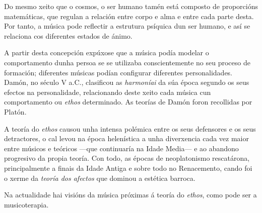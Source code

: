Do mesmo xeito que o cosmos, o ser humano tamén está composto de
proporcións matemáticas, que regulan a relación entre corpo e alma e
entre cada parte desta. Por tanto, a música pode reflectir a estrutura
psíquica dun ser humano, e así se relaciona cos diferentes estados de
ánimo.

A partir desta concepción expúxose que a música podía modelar o
comportamento dunha persoa se se utilizaba conscientemente no seu
proceso de formación; diferentes músicas podían configurar diferentes
personalidades. Damón, no século V a.C., clasificou as \emph{harmoníai}
da súa época segundo os seus efectos na personalidade, relacionando
deste xeito cada música cun comportamento ou \emph{ethos}
determinado. As teorías de Damón foron recollidas por Platón.

A teoría do \emph{ethos} causou unha intensa polémica entre os seus
defensores e os seus detractores, o cal levou na época helenística a
unha diverxencia cada vez maior entre músicos e teóricos ---que
continuaría na Idade Media--- e ao abandono progresivo da propia teoría.
Con todo, as épocas de neoplatonismo rescatárona, principalmente a
finais da Idade Antiga e sobre todo no Renacemento, cando foi o xerme da
\emph{teoría dos afectos} que dominou a estética barroca.

Na actualidade hai visións da música próximas á teoría do \emph{ethos},
como pode ser a musicoterapia.

